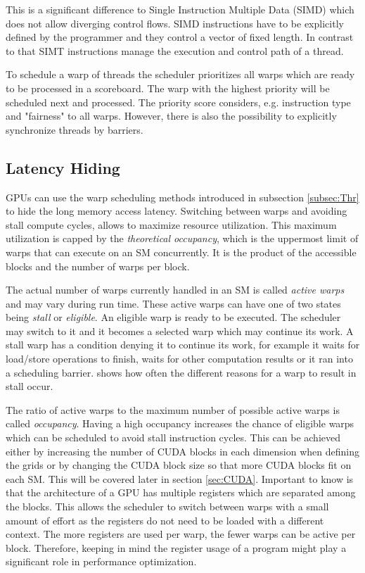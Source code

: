   This is a significant difference to Single Instruction Multiple Data (SIMD) which does not allow diverging control flows.
  SIMD instructions have to be explicitly defined by the programmer and they control a vector of fixed length.
  In contrast to that SIMT instructions manage the execution and control path of a thread.
  
  To schedule a warp of threads the scheduler prioritizes all warps which are ready to be processed in a scoreboard.
  The warp with the highest priority will be scheduled next and processed.
  The priority score considers, e.g. instruction type and "fairness" to all warps.
  However, there is also the possibility to explicitly synchronize threads by barriers.~\cite{Lindholm.2008}

         
\subsection{Latency Hiding}
  GPUs can use the warp scheduling methods introduced in subsection \ref{subsec:Thr} to hide the long memory access latency.
  Switching between warps and avoiding stall compute cycles, allows to maximize resource utilization.
  This maximum utilization is capped by the \textit{theoretical occupancy}, which is the uppermost limit of warps that can execute on an SM concurrently.
  It is the product of the accessible blocks and the number of warps per block.~\cite{NInsight}
  
  The actual number of warps currently handled in an SM is called \textit{active warps} and may vary during run time.
  These active warps can have one of two states being \textit{stall} or \textit{eligible}.
  An eligible warp is ready to be executed.
  The scheduler may switch to it and it becomes a selected warp which may continue its work.
  A stall warp has a condition denying it to continue its work, for example it waits for load/store operations to finish, waits for other computation results or it ran into a scheduling barrier.
  \cite{NInsight} shows how often the different reasons for a warp to result in stall occur.~\cite{NVIDIA.2019}~\cite{volkov.2016}

  The ratio of active warps to the maximum number of possible active warps is called \textit{occupancy}.
  Having a high occupancy increases the chance of eligible warps which can be scheduled to avoid stall instruction cycles.
  This can be achieved either by increasing the number of CUDA blocks in each dimension when defining the grids or by changing the CUDA block size so that more CUDA blocks fit on each SM.
  This will be covered later in section \ref{sec:CUDA}.
  Important to know is that the architecture of a GPU has multiple registers which are separated among the blocks.
  This allows the scheduler to switch between warps with a small amount of effort as the registers do not need to be loaded with a different context.
  The more registers are used per warp, the fewer warps can be active per block.
  Therefore, keeping in mind the register usage of a program might play a significant role in performance optimization.~\cite{NInsight2}

